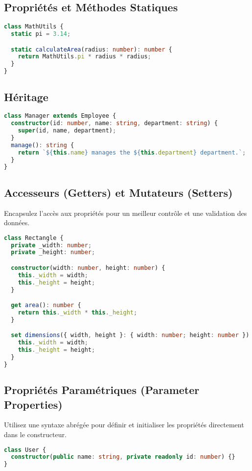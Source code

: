 \documentclass[a4paper,12pt]{article}
\begin{document}
\subsection*{Propriétés et Méthodes Statiques}
\begin{lstlisting}[language=TypeScript]
class MathUtils {
  static pi = 3.14;

  static calculateArea(radius: number): number {
    return MathUtils.pi * radius * radius;
  }
}
\end{lstlisting}

\subsection*{Héritage}
\begin{lstlisting}[language=TypeScript]
class Manager extends Employee {
  constructor(id: number, name: string, department: string) {
    super(id, name, department);
  }
  manage(): string {
    return `${this.name} manages the ${this.department} department.`;
  }
}
\end{lstlisting}

\subsection*{Accesseurs (Getters) et Mutateurs (Setters)}
Encapsulez l'accès aux propriétés pour un meilleur contrôle et une validation des données.

\begin{lstlisting}[language=TypeScript]
class Rectangle {
  private _width: number;
  private _height: number;

  constructor(width: number, height: number) {
    this._width = width;
    this._height = height;
  }

  get area(): number {
    return this._width * this._height;
  }

  set dimensions({ width, height }: { width: number; height: number }) {
    this._width = width;
    this._height = height;
  }
}
\end{lstlisting}

\subsection*{Propriétés Paramétriques (Parameter Properties)}
Utilisez une syntaxe abrégée pour définir et initialiser les propriétés directement dans le constructeur.

\begin{lstlisting}[language=TypeScript]
class User {
  constructor(public name: string, private readonly id: number) {}
}
\end{lstlisting}
\end{document}
